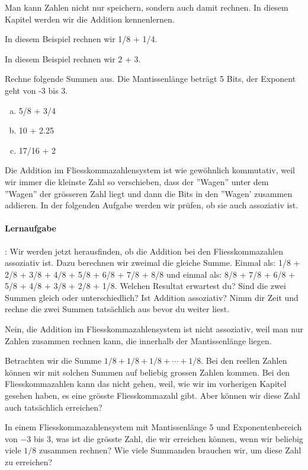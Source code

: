 Man kann Zahlen nicht nur speichern, sondern auch damit rechnen. In diesem Kapitel werden wir die Addition kennenlernen.

\begin{beispiel}
In diesem Beispiel rechnen wir 1/8 + 1/4.
\end{beispiel}

\begin{beispiel}
In diesem Beispiel rechnen wir 2 + 3.
\end{beispiel}

\begin{aufgabe}
Rechne folgende Summen aus. Die Mantissenlänge beträgt 5 Bits, der Exponent geht von -3 bis 3.
\begin{enumerate}[(a)]
\item 5/8 + 3/4
\item 10 + 2.25
\item 17/16 + 2
\end{enumerate}
\end{aufgabe}

Die Addition im Fliesskommazahlensystem ist wie gewöhnlich kommutativ, weil wir immer die kleinste Zahl so verschieben, dass der ''Wagen'' unter dem ''Wagen'' der grösseren Zahl liegt und dann die Bits in den ''Wagen' zusammen addieren. In der folgenden Aufgabe werden wir prüfen, ob sie auch assoziativ ist.

\paragraph{Lernaufgabe}:
Wir werden jetzt herausfinden, ob die Addition bei den Fliesskommazahlen assoziativ ist. Dazu berechnen wir zweimal die gleiche Summe.
Einmal als: 1/8 + 2/8 + 3/8 + 4/8 + 5/8 + 6/8 + 7/8 + 8/8 und einmal als: 8/8 + 7/8 + 6/8 + 5/8 + 4/8 + 3/8 + 2/8 + 1/8.
Welchen Resultat erwartest du?
Sind die zwei Summen gleich oder unterschiedlich?
Ist Addition assoziativ?
Nimm dir Zeit und rechne die zwei Summen tatsächlich aus bevor du weiter liest.

Nein, die Addition im Fliesskommazahlensystem ist nicht assoziativ, weil man nur Zahlen zusammen rechnen kann, die innerhalb der Mantissenlänge liegen.

\begin{aufgabe}\label{ein_achtel}
Betrachten wir die Summe \(1/8 + 1/8 + 1/8 + \dotsb + 1/8\).
Bei den reellen Zahlen können wir mit solchen Summen auf beliebig grossen Zahlen kommen. Bei den Fliesskommazahlen kann das nicht gehen, weil, wie wir im vorherigen Kapitel gesehen haben, es eine grösste Fliesskommazahl gibt. Aber können wir diese Zahl auch tatsächlich erreichen?

In einem Fliesskommazahlensystem mit Mantissenlänge \(5\) und Exponentenbereich von \(-3\) bis \(3\), was ist die grösste Zahl, die wir erreichen können, wenn wir beliebig viele \(1/8\) zusammen rechnen? Wie viele Summanden brauchen wir, um diese Zahl zu erreichen?
\end{aufgabe}

